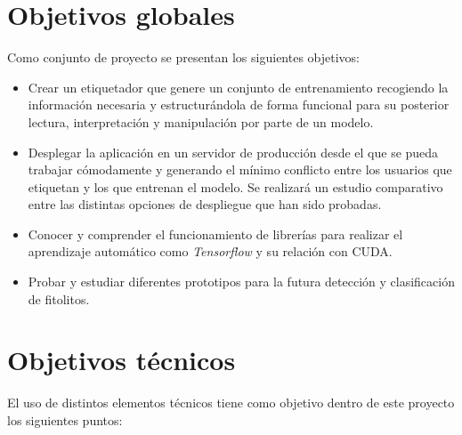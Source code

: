 
\section{Objetivos globales}

Como conjunto de proyecto se presentan los siguientes objetivos:

\begin{itemize}
	\item Crear un etiquetador que genere un conjunto de entrenamiento recogiendo la información necesaria y estructurándola de forma funcional para su posterior lectura, interpretación y manipulación por parte de un modelo.
	
	\item Desplegar la aplicación en un servidor de producción desde el que se pueda trabajar cómodamente y generando el mínimo conflicto entre los usuarios que etiquetan y los que entrenan el modelo. Se realizará un estudio comparativo entre las distintas opciones de despliegue que han sido probadas.
	
	\item Conocer y comprender el funcionamiento de librerías para realizar el aprendizaje automático como \textit{Tensorflow} y su relación con CUDA.
	
	\item Probar y estudiar diferentes prototipos para la futura detección y clasificación de fitolitos.
\end{itemize}

\section{Objetivos técnicos}

El uso de distintos elementos técnicos tiene como objetivo dentro de este proyecto los siguientes puntos:


